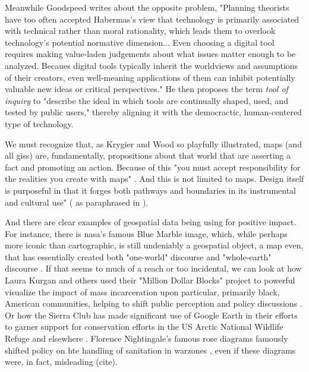 Meanwhile Goodspeed writes about the opposite problem, "Planning theorists have too often accepted Habermas's view that technology is primarily associated with technical rather than moral rationality, which leads them to overlook technology's potential normative dimension... Even choosing a digital tool requires making value-laden judgements about what issues matter enough to be analyzed. Becaues digital tools typically inherit the worldviews and assumptions of their creators, even well-meaning applications of them can inhibit potentially valuable new ideas or critical perspectives." He then proposes the term \textit{tool of inquiry} to "describe the ideal in which tools are continually shaped, used, and tested by public users," \cite{goodspeedScenarioPlanningCities2020} thereby aligning it with the democractic, human-centered type of technology.

We must recognize that, as Krygier and Wood so playfully illustrated, maps (and all \acp{gis}) are, fundamentally, propositions about that world that are asserting a fact and promoting an action. Because of this "you must accept responsibility for the realities you create with maps" \cite{krygierCeEstPas2011}. And this is not limited to maps. Design itself is purposeful in that it forges both pathways and boundaries in its instrumental and cultural use" (\cite{paceyCultureTechnology1983} as paraphrased in \cite{nobleAlgorithmsOppressionHow2018}). 

And there are clear examples of geospatial data being using for positive impact. For instance, there is \ac{nasa}'s famous Blue Marble image, which, while perhaps more iconic than cartographic, is still undeniably a geospatial object, a map even, that has essentially created both "one-world" discourse and "whole-earth" discourse \cite{propenCartographicRepresentationConstruction2011}. If that seems to much of a reach or too incidental, we can look at how Laura Kurgan and others used their "Million Dollar Blocks" project to powerful visualize the impact of mass incarceration upon particular, primarily black, American communities, helping to shift public perception and policy discussions \cite{kurganCloseDistanceMapping2013}. Or how the Sierra Club has made significant use of Google Earth in their efforts to garner support for conservation efforts in the US Arctic National Wildlife Refuge and elsewhere \cite{propenCartographicRepresentationConstruction2011}. Florence Nightingale's famous rose diagrams famously shifted policy on hte handling of sanitation in warzones \cite{friendlyBriefHistoryData2008}, even if these diagrams were, in fact, misleading (cite).

